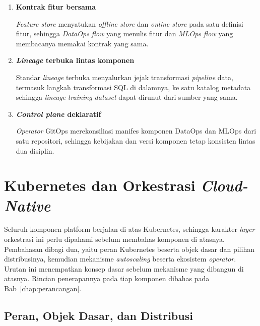 \vspace{0.5em}
\begin{enumerate}
    \item \textbf{Kontrak fitur bersama}

    \textit{Feature store} menyatukan \textit{offline store} dan \textit{online store} pada satu definisi fitur, sehingga \textit{DataOps flow} yang menulis fitur dan \textit{MLOps flow} yang membacanya memakai kontrak yang sama.

    \vspace{0.5em}

    \item \textbf{\textit{Lineage} terbuka lintas komponen}

    Standar \textit{lineage} terbuka menyalurkan jejak transformasi \textit{pipeline} data, termasuk langkah transformasi SQL di dalamnya, ke satu katalog metadata sehingga \textit{lineage} \textit{training dataset} dapat dirunut dari sumber yang sama.

    \vspace{0.5em}

    \item \textbf{\textit{Control plane} deklaratif}

    \textit{Operator} GitOps merekonsiliasi manifes komponen DataOps dan MLOps dari satu repositori, sehingga kebijakan dan versi komponen tetap konsisten lintas dua disiplin.
\end{enumerate}

\section{Kubernetes dan Orkestrasi \textit{Cloud-Native}}
\label{sec:kubernetes}

Seluruh komponen platform berjalan di atas Kubernetes, sehingga karakter \textit{layer} orkestrasi ini perlu dipahami sebelum membahas komponen di atasnya. Pembahasan dibagi dua, yaitu peran Kubernetes beserta objek dasar dan pilihan distribusinya, kemudian mekanisme \textit{autoscaling} beserta ekosistem \textit{operator}. Urutan ini menempatkan konsep dasar sebelum mekanisme yang dibangun di atasnya. Rincian penerapannya pada tiap komponen dibahas pada Bab~\ref{chap:perancangan}.

\subsection{Peran, Objek Dasar, dan Distribusi}
\label{subsec:k8s-peran}

